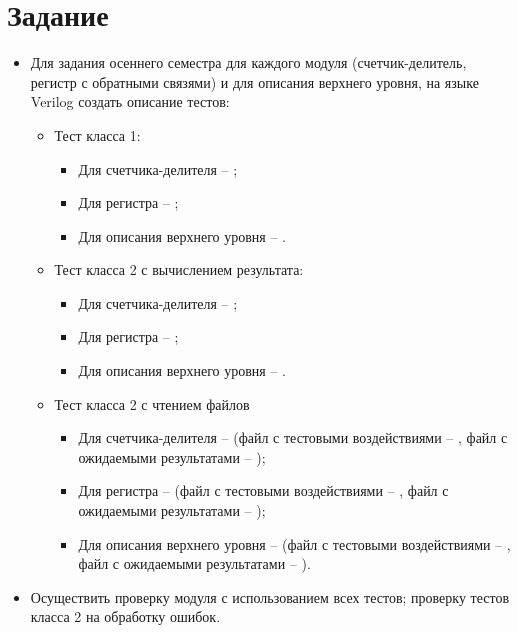 





\tableofcontents
\lstlistoflistings
\listoffigures
\newpage

\section{Задание}

\begin{itemize}
	\item Для задания  осеннего семестра для каждого модуля (счетчик-делитель, регистр с обратными связями) и для описания верхнего уровня, на языке Verilog создать описание тестов:
		\begin{itemize}
			\item Тест класса 1:
				\begin{itemize}
					\item Для счетчика-делителя -- ;
					\item Для регистра -- ;
					\item Для описания верхнего уровня -- .
				\end{itemize}
			\item Тест класса 2 с вычислением результата:
				\begin{itemize}
					\item Для счетчика-делителя -- ;
					\item Для регистра -- ;
					\item Для описания верхнего уровня -- .
				\end{itemize}
			\item Тест класса 2 с чтением файлов
				\begin{itemize}
					\item Для счетчика-делителя --  (файл с тестовыми воздействиями -- , файл с ожидаемыми результатами -- );
					\item Для регистра --  (файл с тестовыми воздействиями -- , файл с ожидаемыми результатами -- );
					\item Для описания верхнего уровня --  (файл с тестовыми воздействиями -- , файл с ожидаемыми результатами -- ).
				\end{itemize}
		\end{itemize}

	\item Осуществить проверку модуля с использованием всех тестов; проверку тестов класса 2 на обработку ошибок.
\end{itemize}

